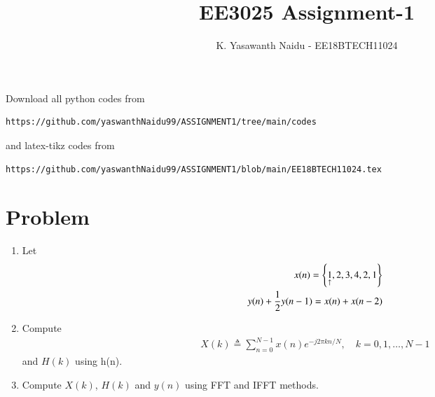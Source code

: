 \documentclass[journal,12pt,twocolumn]{IEEEtran}
\renewcommand\thesection{\arabic{section}}
\begin{document}
     \def\rightbox#1{\makebox[0in][r]{#1}}
     \def\centbox#1{\makebox[0in]{#1}}
     \def\topbox#1{\raisebox{-\baselineskip}[0in][0in]{#1}}
     \def\midbox#1{\raisebox{-0.5\baselineskip}[0in][0in]{#1}}
\vspace{3cm}
\title{EE3025 Assignment-1}
\author{K. Yasawanth Naidu - EE18BTECH11024}
\maketitle
\newpage
\bigskip
\renewcommand{\thefigure}{\theenumi}
\renewcommand{\thetable}{\theenumi}
Download all python codes from 
\begin{lstlisting}
https://github.com/yaswanthNaidu99/ASSIGNMENT1/tree/main/codes
\end{lstlisting}
%
and latex-tikz codes from 
%
\begin{lstlisting}
https://github.com/yaswanthNaidu99/ASSIGNMENT1/blob/main/EE18BTECH11024.tex
\end{lstlisting}


\section{Problem}
\begin{enumerate}[label=\thesection.\arabic*.,ref=\thesection.\theenumi]
    
    \item Let
    \begin{align}
        x(n) = \cbrak{\underset{\uparrow}{1},2,3,4,2,1}
         \label{eq:equation0}\\
        y(n) + \frac{1}{2}y(n-1) = x(n) + x(n-2)	
        \label{eq:equation1}
    \end{align}
    
    \item Compute 
    \begin{align}
        X(k) \triangleq \sum_{n=0}^{N-1} x(n) e^{-j 2 \pi k n / N}, \quad k=0,1, \ldots, N-1
    \end{align}
    and $H(k)$ using h(n).
    
    \item Compute $X(k)$, $H(k)$ and $y(n)$ using FFT and IFFT methods.
\end{enumerate}
\end{document}
